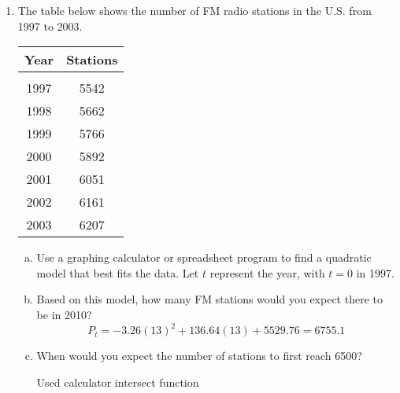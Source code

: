 \begin{enumerate}
\item The table below shows the number of FM radio stations in the U.S. from 1997 to 2003.
\begin{center}
\begin{tabular}{c c}
\textbf{Year} & \textbf{Stations}\\
\hline
 & \\
1997 & 5542\\
1998 & 5662\\
1999 & 5766\\
2000 & 5892\\
2001 & 6051\\
2002 & 6161\\
2003 & 6207
\end{tabular}
\end{center}
\begin{enumerate}[(a)]
\item Use a graphing calculator or spreadsheet program to find a quadratic model that best fits the data.  Let $t$ represent the year, with $t=0$ in 1997. 
\item Based on this model, how many FM stations would you expect there to be in 2010? 
\[P_t = -3.26(13)^2 + 136.64(13) + 5529.76 = 6755.1\]
\item When would you expect the number of stations to first reach 6500? 
\begin{center}
Used calculator intersect function
\end{center}
\end{enumerate}


\end{enumerate}
